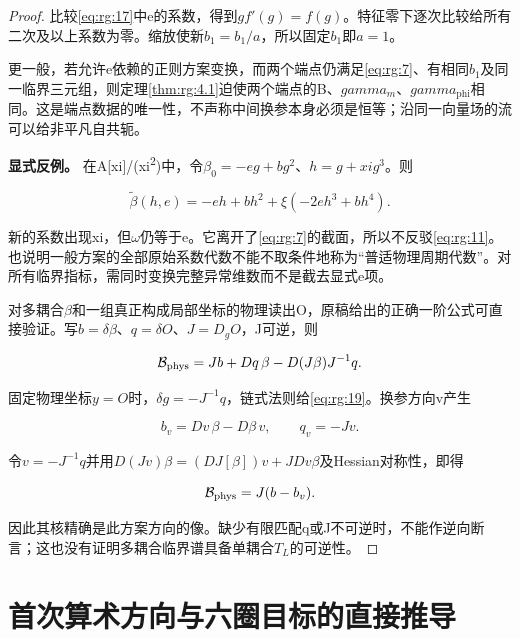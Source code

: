 \documentclass[11pt,a4paper,oneside]{ctexrep}
\theoremstyle{cnplain}
\theoremstyle{definition}
\theoremstyle{remark}
\begin{document}
\begin{proof}

比较\eqref{eq:rg:17}中e的系数，得到\(g f'(g)=f(g)\)。特征零下逐次比较给所有二次及以上系数为零。缩放使新\(b_1=b_1/a\)，所以固定\(b_1\)即\(a=1\)。

更一般，若允许e依赖的正则方案变换，而两个端点仍满足\eqref{eq:rg:7}、有相同\(b_1\)及同一临界三元组，则定理\ref{thm:rg:4.1}迫使两个端点的B、\(gamma_m\)、\(gamma_{\mathrm{phi}}\)相同。这是端点数据的唯一性，不声称中间换参本身必须是恒等；沿同一向量场的流可以给非平凡自共轭。

\textbf{显式反例。} 在A{[}xi{]}/(xi\textsuperscript{2})中，令\(\beta _0=-eg+b g^{2}\)、\(h=g+xi g^{3}\)。则

\begin{equation}
\widetilde\beta(h,e)=-eh+b h^{2}+
                 \xi(-2e h^{3}+b h^{4}).               \label{eq:rg:18}
\end{equation}

新的系数出现xi，但\(\omega\)仍等于e。它离开了\eqref{eq:rg:7}的截面，所以不反驳\eqref{eq:rg:11}。也说明一般方案的全部原始系数代数不能不取条件地称为``普适物理周期代数''。对所有临界指标，需同时变换完整异常维数而不是截去显式e项。

对多耦合\(\beta\)和一组真正构成局部坐标的物理读出O，原稿给出的正确一阶公式可直接验证。写\(b=\delta  \beta\)、\(q=\delta  O\)、\(J=D_g O\)，J可逆，则

\begin{equation}
{\cal B}_{\rm phys}=Jb+Dq\,\beta-D(J\beta)J^{-1}q. \label{eq:rg:19}
\end{equation}

固定物理坐标\(y=O\)时，\(\delta  g=-J^{-1}q\)，链式法则给\eqref{eq:rg:19}。换参方向v产生

\begin{equation}
b_v=Dv\,\beta-D\beta\,v,\qquad q_v=-Jv.
\end{equation}

令\(v=-J^{-1}q\)并用\(D(Jv) \beta =(DJ[\beta ])v+J Dv \beta\)及Hessian对称性，即得

\begin{equation}
{\cal B}_{\rm phys}=J(b-b_v).
\end{equation}

因此其核精确是此方案方向的像。缺少有限匹配q或J不可逆时，不能作逆向断言；这也没有证明多耦合临界谱具备单耦合\(T_L\)的可逆性。

\end{proof}

\section{首次算术方向与六圈目标的直接推导}\label{sec:rg:7}
\end{document}
